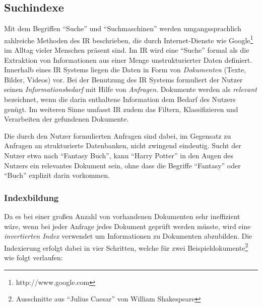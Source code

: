 \subsection{Suchindexe}
\label{sec:search}

Mit dem Begriffen ``Suche'' und ``Suchmaschinen'' werden umgangssprachlich zahlreiche Methoden des  \ac{IR} beschrieben, die durch Internet-Dienste wie Google\footnote{http://www.google.com} im Alltag vieler Menschen präsent sind. Im \acs{IR} wird eine ``Suche'' formal als die Extraktion von Informationen aus einer Menge unstrukturierter Daten definiert. Innerhalb eines \acs{IR} Systems liegen die Daten in Form von \textit{Dokumenten} (Texte, Bilder, Videos) vor. Bei der Benutzung des \acs{IR} Systems formuliert der Nutzer seinen \textit{Informationsbedarf} mit Hilfe von \textit{Anfragen}. Dokumente werden als \textit{relevant} bezeichnet, wenn die darin enthaltene Information dem Bedarf des Nutzers genügt. Im weiteren Sinne umfasst \acs{IR} zudem das Filtern, Klassifizieren und Verarbeiten der gefundenen Dokumente.  \citep{Manning2008}

Die durch den Nutzer formulierten Anfragen sind dabei, im Gegensatz zu Anfragen an strukturierte Datenbanken, nicht zwingend eindeutig. Sucht der Nutzer etwa nach ``Fantasy Buch'', kann ``Harry Potter'' in den Augen des Nutzers ein relevantes Dokument sein, ohne dass die Begriffe ``Fantasy'' oder ``Buch'' explizit darin vorkommen.%

\subsubsection{Indexbildung} \label{sec:indexcreation}

Da es bei einer großen Anzahl von vorhandenen Dokumenten sehr ineffizient wäre, wenn bei jeder Anfrage jedes Dokument geprüft werden müsste, wird eine \textit{invertierten Index} verwendet um Informationen zu Dokumenten abzubilden. Die Indexierung erfolgt dabei in vier Schritten, welche für zwei Beispieldokumente\footnote{Ausschnitte aus ``Julius Caesar'' von William Shakespeare} wie folgt verlaufen:

